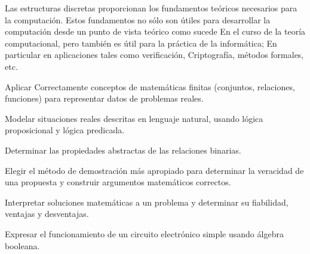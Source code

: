 \begin{syllabus}


\begin{justification}
Las estructuras discretas proporcionan los fundamentos teóricos necesarios para la computación. Estos fundamentos no sólo son útiles para desarrollar la computación desde un punto de vista teórico como sucede
En el curso de la teoría computacional, pero también es útil para la práctica de la informática; En particular en aplicaciones tales como verificación,
Criptografía, métodos formales, etc.
\end{justification}


\begin{goals}
\item Aplicar Correctamente conceptos de matemáticas finitas (conjuntos, relaciones, funciones) para representar datos de problemas reales.
\item Modelar situaciones reales descritas en lenguaje natural, usando lógica proposicional y lógica predicada.
\item Determinar las propiedades abstractas de las relaciones binarias.
\item Elegir el método de demostración más apropiado para determinar la veracidad de una propuesta y construir argumentos matemáticos correctos.
\item Interpretar soluciones matemáticas a un problema y determinar su fiabilidad, ventajas y desventajas.
\item Expresar el funcionamiento de un circuito electrónico simple usando álgebra booleana.
\end{goals}



\end{syllabus}
